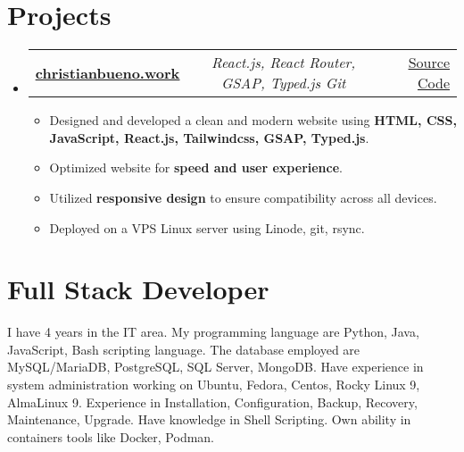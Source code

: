 \documentclass[a4paper,11pt]{article}
\makeatletter
\newcommand{\resumeItem}[1]{
  \item\small{#1}
}
\newcommand{\resumeItemListStart}{\begin{itemize}[rightmargin=0.11in]}
\newcommand{\resumeItemListEnd}{\end{itemize}}
\newcommand{\resumeTrioHeading}[3]{
  \item\small{
    \begin{tabular*}{0.96\textwidth}[t]{
      l@{\extracolsep{\fill}}c@{\extracolsep{\fill}}r
    }
      \textbf{#1} & \textit{#2} & #3
    \end{tabular*}
  }
}
\newcommand{\resumeHeadingListStart}{
  \begin{itemize}[leftmargin=0.15in, label={}]
}
\newcommand{\resumeHeadingListEnd}{\end{itemize}}
\makeatother
\begin{document}

\section{Projects}
  \resumeHeadingListStart{}
    \resumeTrioHeading{\href{https://www.christianbueno.work}{\uline{christianbueno.work}}}{React.js, React Router, GSAP, Typed.js Git}{\href{https://proect1.com/source-code/}{\uline{Source Code}}}
      \resumeItemListStart{}
        \resumeItem{Designed and developed a clean and modern website using \textbf{HTML, CSS, JavaScript, React.js, Tailwindcss, GSAP, Typed.js}.}
        \resumeItem{Optimized website for \textbf{speed and user experience}.}
        \resumeItem{Utilized \textbf{responsive design} to ensure compatibility across all devices.}
        \resumeItem{Deployed on a VPS Linux server using Linode, git, rsync.}
      \resumeItemListEnd{}

      
  \resumeHeadingListEnd{}



\section{Full Stack Developer}
\small{
  I have 4 years in the IT area. My programming language are Python, Java, JavaScript, Bash scripting language. The database employed are MySQL/MariaDB, PostgreSQL, SQL Server, MongoDB. Have experience in system administration working on  Ubuntu, Fedora, Centos, Rocky Linux 9, AlmaLinux 9. Experience in Installation, Configuration, Backup, Recovery, Maintenance, Upgrade. Have knowledge in Shell Scripting. Own ability in containers tools like Docker, Podman.
}
\end{document}
